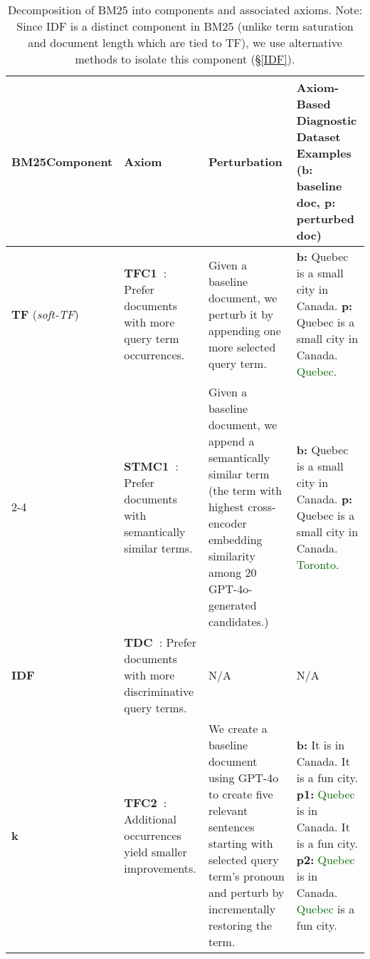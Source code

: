 
\begin{table*}[h!]
  \small
  \centering
        \caption{Decomposition of BM25 into components and associated axioms. Note: Since IDF is a distinct component in BM25 (unlike term saturation and document length which are tied to TF), we use alternative methods to isolate this component (\S\ref{IDF}).}
  \label{tab:axioms_table}
  \begin{tabular}{p{1.6cm} p{3.8cm} p{5.2cm} p{5.8cm}}
    \toprule
    
    \textbf{BM25\newline Component} & \textbf{Axiom} & \textbf{Perturbation} & \textbf{Axiom-Based Diagnostic Dataset Examples }\newline(b: baseline doc, p: perturbed doc) \\
    \midrule
    \textbf{TF} (\textit{soft-TF}) 
    & \textbf{TFC1~\cite{fang2004formal}}: Prefer documents with more query term occurrences. 
    & Given a baseline document, we perturb it by appending one more selected query term. 
    & \textbf{b:} Quebec is a small city in Canada. \newline 
      \textbf{p:} Quebec is a small city in Canada. \textcolor{darkgreen}{Quebec}. \\
    \cmidrule(l){2-4}
    & \textbf{STMC1~\cite{fang2006semantic}}: Prefer documents with semantically similar terms. 
    & Given a baseline document, we append a semantically similar term (the term with highest cross-encoder embedding similarity among 20 GPT-4o-generated candidates.)
    & \textbf{b:} Quebec is a small city in Canada. \newline 
      \textbf{p:} Quebec is a small city in Canada. \textcolor{darkgreen}{Toronto}. \\
    \midrule
    \textbf{IDF} 
    & \textbf{TDC~\cite{fang2004formal}}: Prefer documents with more discriminative query terms. 
    & N/A  
    & N/A \newline 
      \\
    \midrule
    \textbf{k} 
    & \textbf{TFC2~\cite{fang2004formal}}: Additional occurrences yield smaller improvements. 
    & We create a baseline document using GPT-4o to create five relevant sentences starting with selected query term's pronoun and perturb by incrementally restoring the term.
    & \textbf{b:} It is in Canada. It is a fun city. \newline 
      \textbf{p1:} \textcolor{darkgreen}{Quebec} is in Canada. It is a fun city. \newline 
      \textbf{p2:} \textcolor{darkgreen}{Quebec} is in Canada. \textcolor{darkgreen}{Quebec} is a fun city. \\

\end{tabular}
\end{table*}
